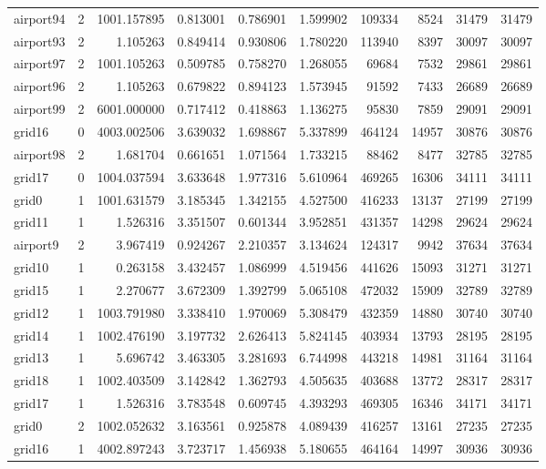 \begin{longtable}{|l|r|r|r|r|r|r|r|r|r|}
airport94 & 2 & 1001.157895 & 0.813001 & 0.786901 & 1.599902 & 109334 & 8524 & 31479 & 31479 \\
airport93 & 2 & 1.105263 & 0.849414 & 0.930806 & 1.780220 & 113940 & 8397 & 30097 & 30097 \\
airport97 & 2 & 1001.105263 & 0.509785 & 0.758270 & 1.268055 & 69684 & 7532 & 29861 & 29861 \\
airport96 & 2 & 1.105263 & 0.679822 & 0.894123 & 1.573945 & 91592 & 7433 & 26689 & 26689 \\
airport99 & 2 & 6001.000000 & 0.717412 & 0.418863 & 1.136275 & 95830 & 7859 & 29091 & 29091 \\
grid16 & 0 & 4003.002506 & 3.639032 & 1.698867 & 5.337899 & 464124 & 14957 & 30876 & 30876 \\
airport98 & 2 & 1.681704 & 0.661651 & 1.071564 & 1.733215 & 88462 & 8477 & 32785 & 32785 \\
grid17 & 0 & 1004.037594 & 3.633648 & 1.977316 & 5.610964 & 469265 & 16306 & 34111 & 34111 \\
grid0 & 1 & 1001.631579 & 3.185345 & 1.342155 & 4.527500 & 416233 & 13137 & 27199 & 27199 \\
grid11 & 1 & 1.526316 & 3.351507 & 0.601344 & 3.952851 & 431357 & 14298 & 29624 & 29624 \\
airport9 & 2 & 3.967419 & 0.924267 & 2.210357 & 3.134624 & 124317 & 9942 & 37634 & 37634 \\
grid10 & 1 & 0.263158 & 3.432457 & 1.086999 & 4.519456 & 441626 & 15093 & 31271 & 31271 \\
grid15 & 1 & 2.270677 & 3.672309 & 1.392799 & 5.065108 & 472032 & 15909 & 32789 & 32789 \\
grid12 & 1 & 1003.791980 & 3.338410 & 1.970069 & 5.308479 & 432359 & 14880 & 30740 & 30740 \\
grid14 & 1 & 1002.476190 & 3.197732 & 2.626413 & 5.824145 & 403934 & 13793 & 28195 & 28195 \\
grid13 & 1 & 5.696742 & 3.463305 & 3.281693 & 6.744998 & 443218 & 14981 & 31164 & 31164 \\
grid18 & 1 & 1002.403509 & 3.142842 & 1.362793 & 4.505635 & 403688 & 13772 & 28317 & 28317 \\
grid17 & 1 & 1.526316 & 3.783548 & 0.609745 & 4.393293 & 469305 & 16346 & 34171 & 34171 \\
grid0 & 2 & 1002.052632 & 3.163561 & 0.925878 & 4.089439 & 416257 & 13161 & 27235 & 27235 \\
grid16 & 1 & 4002.897243 & 3.723717 & 1.456938 & 5.180655 & 464164 & 14997 & 30936 & 30936 \\

\end{longtable}
